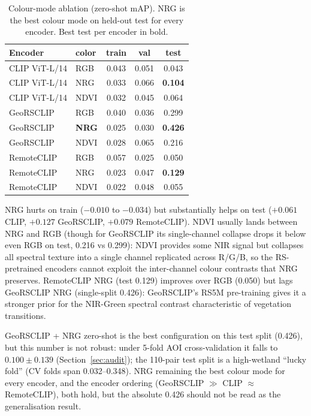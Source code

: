 \documentclass{article}
\begin{document}
\begin{table}[H]
    \centering
    \caption{Colour-mode ablation (zero-shot mAP). NRG is the best colour mode on
    held-out test for every encoder. Best test per encoder in bold.}
    \label{tab:nir}
    \begin{tabular}{llccc}
        \toprule
        \textbf{Encoder} & \textbf{color} & \textbf{train} & \textbf{val} & \textbf{test} \\
        \midrule
        CLIP ViT-L/14 & RGB  & 0.043 & 0.051 & 0.043 \\
        CLIP ViT-L/14 & NRG  & 0.033 & 0.066 & \textbf{0.104} \\
        CLIP ViT-L/14 & NDVI & 0.032 & 0.045 & 0.064 \\
        GeoRSCLIP     & RGB  & 0.040 & 0.036 & 0.299 \\
        GeoRSCLIP     & \textbf{NRG}  & 0.025 & 0.030 & \textbf{0.426} \\
        GeoRSCLIP     & NDVI & 0.028 & 0.065 & 0.216 \\
        RemoteCLIP    & RGB  & 0.057 & 0.025 & 0.050 \\
        RemoteCLIP    & NRG  & 0.023 & 0.047 & \textbf{0.129} \\
        RemoteCLIP    & NDVI & 0.022 & 0.048 & 0.055 \\
        \bottomrule
    \end{tabular}
\end{table}

NRG hurts on train ($-0.010$ to $-0.034$) but substantially helps on test
($+0.061$ CLIP, $+0.127$ GeoRSCLIP, $+0.079$ RemoteCLIP). NDVI usually lands
between NRG and RGB (though for GeoRSCLIP its single-channel collapse drops it
below even RGB on test, 0.216 vs 0.299): NDVI provides some NIR signal but
collapses all spectral texture into a single channel replicated across R/G/B, so
the RS-pretrained encoders cannot exploit the inter-channel colour contrasts that
NRG preserves. RemoteCLIP NRG
(test 0.129) improves over RGB (0.050) but lags GeoRSCLIP NRG (single-split 0.426):
GeoRSCLIP's RS5M pre-training gives it a stronger prior for the NIR-Green
spectral contrast characteristic of vegetation transitions.

GeoRSCLIP + NRG zero-shot is the best configuration on this test split
(0.426), but this number is not robust: under 5-fold AOI
cross-validation it falls to $0.100 \pm 0.139$ (Section~\ref{sec:audit}); the
110-pair test split is a high-wetland ``lucky fold'' (CV folds span
0.032--0.348). NRG remaining the best colour mode for every encoder, and the
encoder ordering (GeoRSCLIP $\gg$ CLIP $\approx$ RemoteCLIP), both hold, but the
absolute 0.426 should not be read as the generalisation result.
\end{document}
